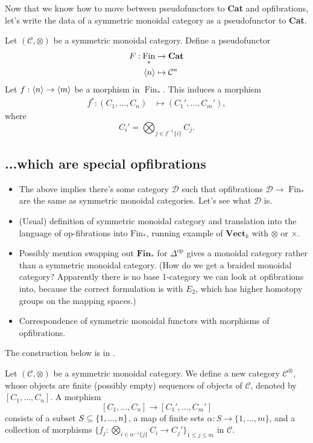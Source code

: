 \documentclass{MetricNotes2023}
\def\subq{\ensuremath\subseteq}
\DeclareMathOperator{\Fin}{Fin}
\begin{document}
Now that we know how to move between pseudofunctors to \textbf{Cat} and opfibrations, let's write the data of a symmetric monoidal category as a pseudofunctor to \textbf{Cat}.

Let \((\mathcal{C}, \otimes)\) be a symmetric monoidal category. Define a pseudofunctor 
\begin{align*}
F : \Fin_* &\to \textbf{Cat}\\
\ang{n}&\mapsto \mathcal{C}^n
\end{align*}
Let \(f : \langle n\rangle\to \langle m\rangle\) be a morphism in \(\Fin_*\). This induces a morphism 
\begin{align*}
f^* : (C_1, ...,C_n) &\mapsto (C_1', ..., C_m'),	
\end{align*}
where
\[C_i' = \bigotimes_{j \in f^{-1}\{i\}}C_j.\]


\subsection{...which are special opfibrations}

\begin{itemize}
\item The above implies there's some category \(\mathcal{D}\) such that opfibrations \(\mathcal{D}\to \Fin_*\) are the same as symmetric monoidal categories. Let's see what \(\mathcal{D}\) is.
\item (Usual) definition of symmetric monoidal category and translation into the language of op-fibrations into \(\text{Fin}_*\), running example of \(\textbf{Vect}_k\) with \(\otimes\) or \(\times\). 
\item Possibly mention swapping out \(\textbf{Fin}_*\) for \(\Delta^{\text{op}}\) gives a monoidal category rather than a symmetric monoidal category. (How do we get a braided monoidal category? Apparently there is no base 1-category we can look at opfibrations into, because the correct formulation is with \(E_2\), which has higher homotopy groups on the mapping spaces.)
\item Correspondence of symmetric monoidal functors with morphisms of opfibrations.
\end{itemize}

The construction below is in \autocite{higheralgebra}. 

Let \((\mathcal{C}, \otimes)\) be a symmetric monoidal category. We define a new category \(\mathcal{C}^\otimes\), whose objects are finite (possibly empty) sequences of objects of \(\mathcal{C}\), denoted by \([C_1, ..., C_n]\). A morphism 
\[[C_1, ..., C_n]\to [C_1', ..., C_m']\]
consists of a subset \(S \subq \{1, ..., n\}\), a map of finite sets \(\alpha : S \to \{1, ..., m\}\), and a collection of morphisms \(\{f_j : \bigotimes_{i \in \alpha^{-1}\{j\}} C_i \to C_j'\}_{1 \leq j \leq m}\) in \(\mathcal{C}\). 
\end{document}
